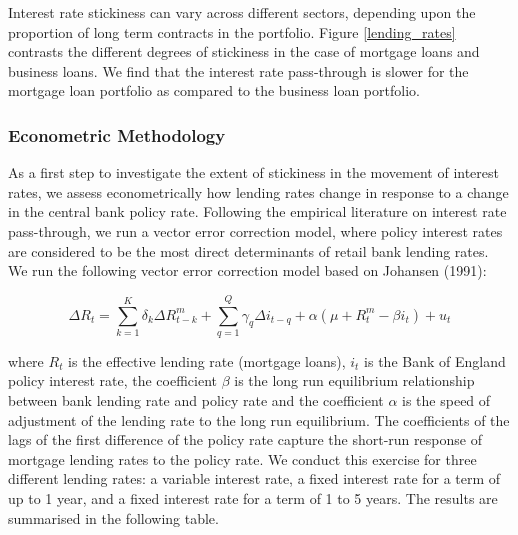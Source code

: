 \documentclass[12pt]{article}
\numberwithin{equation}{section}
\begin{document}
Interest rate stickiness can vary across different sectors, depending upon the proportion of long term contracts in the portfolio. Figure \ref{lending_rates} contrasts the different degrees of stickiness in the case of mortgage loans and business loans. We find that the interest rate pass-through is slower for the mortgage loan portfolio as compared to the business loan portfolio.

	
	


\subsubsection{Econometric Methodology}


As a first step to investigate the extent of stickiness in the movement of interest rates, we assess econometrically how lending rates change in response to a change in the central bank policy rate. Following the empirical literature on interest rate pass-through, we run a vector error correction model, where policy interest rates  are considered to be the most direct determinants of retail bank lending rates. We run the following vector error correction model based on Johansen (1991): 

\begin{equation}
{\Delta}R_{t}=\sum _{k=1}^{K }\delta_{k}{\Delta}R^m_{t-k}+\sum _{q=1}^{Q }\gamma_{q}{\Delta}i_{t-q}+\alpha (\mu+R^m_{t}-\beta i_{t})+u_{t}	
\end{equation}

where $R_{t}$ is the effective lending rate (mortgage loans), $i_{t}$ is the Bank of England policy interest rate, the coefficient $\beta$ is the long run equilibrium relationship between bank lending rate and policy rate and the coefficient $\alpha$ is the speed of adjustment of the lending rate to the long run equilibrium. The coefficients of the lags of the first difference of the policy rate capture the short-run response of mortgage lending rates to the policy rate. We conduct this exercise for three different lending rates: a variable interest rate, a fixed interest rate for a term of up to 1 year, and a fixed interest rate for a term of 1 to 5 years. The results are summarised in the following table.
\end{document}

